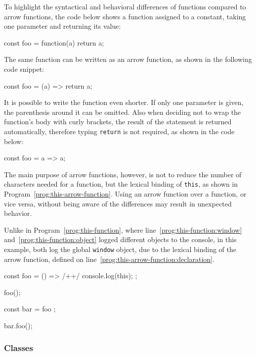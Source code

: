 To highlight the syntactical and behavioral differences of functions compared to arrow functions, the code below shows a function assigned to a constant, taking one parameter and returning its value:
\begin{JsCode}[numbers=none]
const foo = function(a) {
  return a;
}
\end{JsCode}
The same function can be written as an arrow function, as shown in the following code snippet:
\begin{JsCode}[numbers=none]
const foo = (a) => {
  return a;
}
\end{JsCode}
It is possible to write the function even shorter. If only one parameter is given, the parenthesis around it can be omitted. Also when deciding not to wrap the function's body with curly brackets, the result of the statement is returned automatically, therefore typing \texttt{return} is not required, as shown in the code below:
\begin{JsCode}[numbers=none]
const foo = a => a;
\end{JsCode}
The main purpose of arrow functions, however, is not to reduce the number of characters needed for a function, but the lexical binding of \texttt{this}, as shown in Program~\ref{prog:this-arrow-function}. Using an arrow function over a function, or vice versa, without being aware of the differences may result in unexpected behavior.
\begin{program}
\caption{Unlike in Program~\ref{prog:this-function}, where line~\ref{prog:this-function:window} and~\ref{prog:this-function:object} logged different objects to the console, in this example, both log the global \texttt{window} object, due to the lexical binding of the arrow function, defined on line~\ref{prog:this-arrow-function:declaration}.}
\label{prog:this-arrow-function}
\begin{JsCode}
const foo = () => { /+\label{prog:this-arrow-function:declaration}+/
  console.log(this);
};

foo();

const bar = { foo };

bar.foo();
\end{JsCode}
\end{program}

\subsubsection{Classes}

